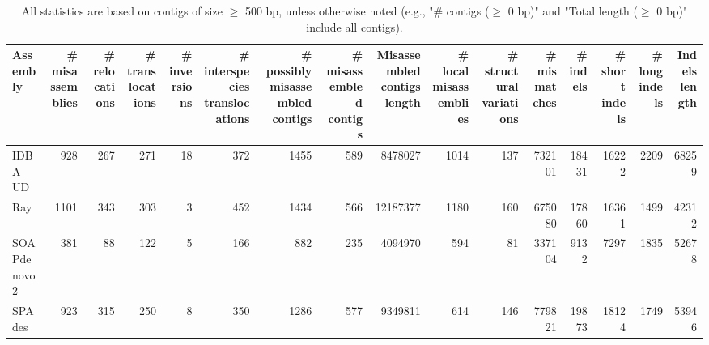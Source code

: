 \documentclass[12pt,a4paper]{article}
\begin{document}
\begin{table}[ht]
\begin{center}
\caption{All statistics are based on contigs of size $\geq$ 500 bp, unless otherwise noted (e.g., "\# contigs ($\geq$ 0 bp)" and "Total length ($\geq$ 0 bp)" include all contigs).}
\begin{tabular}{|l*{15}{|r}|}
\hline
Assembly & \# misassemblies &     \# relocations &     \# translocations &     \# inversions &     \# interspecies translocations & \# possibly misassembled contigs & \# misassembled contigs & Misassembled contigs length & \# local misassemblies & \# structural variations & \# mismatches & \# indels &     \# short indels &     \# long indels & Indels length \\ \hline
IDBA\_UD & 928 & 267 & 271 & 18 & 372 & 1455 & 589 & 8478027 & 1014 & 137 & 732101 & 18431 & 16222 & 2209 & 68259 \\ \hline
Ray & 1101 & 343 & 303 & 3 & 452 & 1434 & 566 & 12187377 & 1180 & 160 & 675080 & 17860 & 16361 & 1499 & 42312 \\ \hline
SOAPdenovo2 & 381 & 88 & 122 & 5 & 166 & 882 & 235 & 4094970 & 594 & 81 & 337104 & 9132 & 7297 & 1835 & 52678 \\ \hline
SPAdes & 923 & 315 & 250 & 8 & 350 & 1286 & 577 & 9349811 & 614 & 146 & 779821 & 19873 & 18124 & 1749 & 53946 \\ \hline
\end{tabular}
\end{center}
\end{table}
\end{document}

